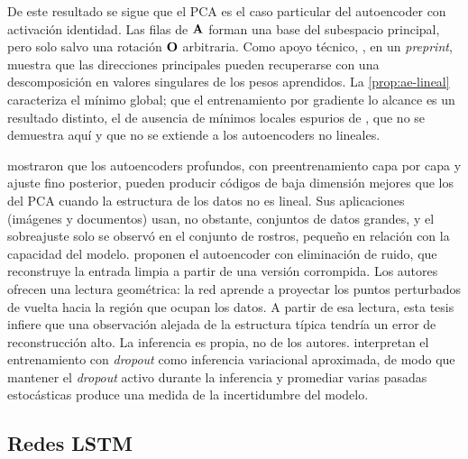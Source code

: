 De este resultado se sigue que el PCA es el caso particular del autoencoder con activación
identidad. Las filas de $\mathbf{A}$ forman una base del subespacio principal, pero solo salvo una
rotación $\mathbf{O}$ arbitraria. Como apoyo técnico,
\textcite{plaut_2018}, en un \emph{preprint},
muestra que las direcciones principales pueden recuperarse con una descomposición en valores
singulares de los pesos aprendidos. La \cref{prop:ae-lineal} caracteriza el mínimo global; que el
entrenamiento por gradiente lo alcance es un resultado distinto, el de ausencia de mínimos locales
espurios de \textcite{baldi_hornik_1989}, que no se demuestra aquí y que no se extiende a los
autoencoders no lineales.

\textcite{hinton_salakhutdinov_2006} mostraron que los autoencoders profundos, con
preentrenamiento capa por capa y ajuste fino posterior, pueden producir códigos de baja dimensión
mejores que los del PCA cuando la estructura de los datos no es lineal. Sus aplicaciones (imágenes
y documentos) usan, no obstante, conjuntos de datos grandes, y el sobreajuste solo se observó en el
conjunto de rostros, pequeño en relación con la capacidad del modelo.
\textcite{vincent_et_al_2008} proponen el autoencoder con
eliminación de ruido, que reconstruye la entrada limpia a partir de una versión corrompida. Los
autores ofrecen una lectura geométrica: la red aprende a proyectar los puntos perturbados de vuelta
hacia la región que ocupan los datos. A partir de esa lectura, esta tesis infiere que una
observación alejada de la estructura típica tendría un error de reconstrucción alto. La inferencia
es propia, no de los autores. \textcite{gal_ghahramani_2016} interpretan el entrenamiento con \emph{dropout} como
inferencia variacional aproximada, de modo que mantener el \emph{dropout} activo durante la
inferencia y promediar varias pasadas estocásticas produce una medida de la incertidumbre del
modelo.

\subsection{Redes LSTM}

